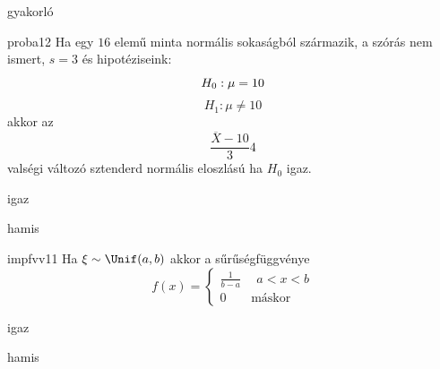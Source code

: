 \documentclass[12pt]{article}
\begin{document}
\begin{quiz}{gyakorló}
\begin{multi}[feedback={A feltételek mellett a fenti Student (t) eloszlású.}]{proba12}
Ha egy $16$ elemű minta normális sokaságból származik, a szórás nem ismert, $s=3$ és hipotéziseink:
$$
H_0: \mu=10 \\
$$
$$
H_1: \mu\neq 10
$$
akkor az 
$$
\frac{\overline{X}-10}{3}4
$$
valségi változó sztenderd normális eloszlású ha $H_0$ igaz.
\item igaz
\item* hamis
\end{multi}
\begin{multi}[feedback={Def.}]{impfvv11}
Ha $\xi\sim \Unif(a,b)$ akkor a sűrűségfüggvénye 
$$
f(x)=
\begin{cases}
\frac{1}{b-a} & \ \ a<x<b \\
0 & \text{máskor} 
\end{cases}
$$
\item* igaz
\item hamis
\end{multi}
\end{quiz}
\end{document}
